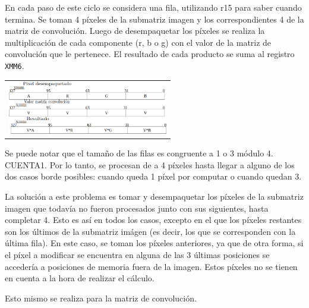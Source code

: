         En cada paso de este ciclo se considera una fila, utilizando r15 para saber cuando termina. Se toman 4 píxeles de la submatriz imagen y los correspondientes 4 de la matriz de convolución. Luego de desempaquetar los píxeles se realiza la multiplicación de cada componente (r, b o g) con el valor de la matriz de convolución que le pertenece. El resultado de cada producto se suma al registro \texttt{XMM6}. 

        {\centering \begin{tabular}{c}
          \includegraphics[width=7cm]{./imagenes/3bis.png} \\
        \end{tabular}}

        Se puede notar que el tamaño de las filas es congruente a 1 o 3 módulo 4. 
        CUENTA1. Por lo tanto, se procesan de a 4 píxeles hasta llegar a alguno de los dos casos borde posibles: cuando queda 1 píxel por computar o cuando quedan 3. 
        
        La solución a este problema es tomar y desempaquetar los píxeles de la submatriz imagen que todavía no fueron procesados junto con sus siguientes, hasta completar 4. Esto es así en todos los casos, excepto en el que los píxeles restantes son los últimos de la submatriz imágen (es decir, los que se corresponden con la última fila). En este caso, se toman los píxeles anteriores, ya que de otra forma, si el píxel a modificar se encuentra en alguna de las 3 últimas posiciones se accedería a posiciones de memoria fuera de la imagen. Estos píxeles no se tienen en cuenta a la hora de realizar el cálculo. 
          
        Esto mismo se realiza para la matriz de convolución.
          
